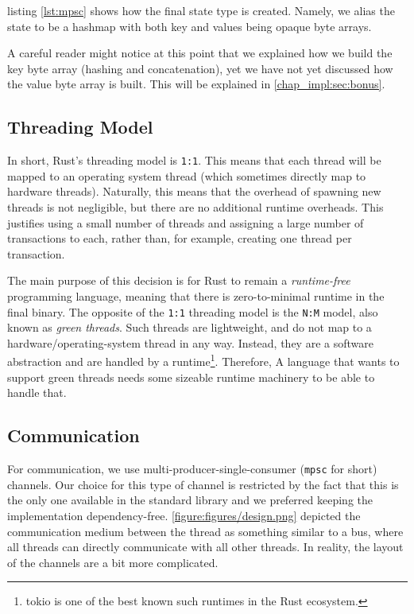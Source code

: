 listing \ref{lst:mpsc} shows how the final state type is created. Namely, we alias the state to be a
hashmap with both key and values being opaque byte arrays.

\begin{remark}
	A careful reader might notice at this point that we explained how we build the key byte array
	(hashing and concatenation), yet we have not yet discussed how the value byte array is built.
	This will be explained in \ref{chap_impl:sec:bonus}.
\end{remark}

\subsection{Threading Model}

In short, Rust's threading model is \texttt{1:1}. This means that each thread will be mapped to an
operating system thread (which sometimes directly map to hardware threads). Naturally, this means
that the overhead of spawning new threads is not negligible, but there are no additional runtime
overheads. This justifies using a small number of threads and assigning a large number of
transactions to each, rather than, for example, creating one thread per transaction.

The main purpose of this decision is for Rust to remain a \textit{runtime-free} programming
language\cite{RustJourneyAsync}, meaning that there is zero-to-minimal runtime in the final binary.
The opposite of the \texttt{1:1} threading model is the \texttt{N:M} model, also known as
\textit{green threads}. Such threads are lightweight, and do not map to a hardware/operating-system
thread in any way. Instead, they are a software abstraction and are handled by a
runtime\footnote{tokio is one of the best known such runtimes in the Rust
ecosystem\cite{TokioRust}.}. Therefore, A language that wants to support green threads needs some
sizeable runtime machinery to be able to handle that.

\subsection{Communication}

For communication, we use multi-producer-single-consumer\cite{StdSyncMpsc} (\texttt{mpsc} for short)
channels. Our choice for this type of channel is restricted by the fact that this is the only one
available in the standard library and we preferred keeping the implementation dependency-free.
\ref{figure:figures/design.png} depicted the communication medium between the thread as something
similar to a bus, where all threads can directly communicate with all other threads. In reality, the
layout of the channels are a bit more complicated.

